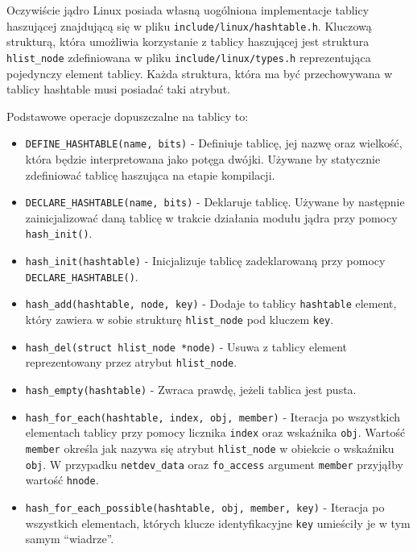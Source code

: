 \documentclass[11pt]{scrartcl}
\begin{document}
Oczywiście jądro Linux posiada własną uogólniona implementacje tablicy haszującej znajdującą się w pliku \texttt{include/linux/hashtable.h}.  Kluczową strukturą, która umożliwia korzystanie z tablicy haszującej jest struktura \texttt{hlist\_node} zdefiniowana w pliku \texttt{include/linux/types.h} reprezentująca pojedynczy element tablicy. Każda struktura, która ma być przechowywana w tablicy hashtable musi posiadać taki atrybut.

Podstawowe operacje dopuszczalne na tablicy to:

\begin{itemize}
\itemsep1pt\parskip0pt
\item
  \texttt{DEFINE\_HASHTABLE(name, bits)} - Definiuje tablicę, jej nazwę oraz wielkość, która będzie interpretowana jako potęga dwójki. Używane by statycznie zdefiniować tablicę haszująca na etapie kompilacji.
\item
  \texttt{DECLARE\_HASHTABLE(name, bits)} - Deklaruje tablicę. Używane by następnie zainicjalizować daną tablicę w trakcie działania modułu jądra przy pomocy \texttt{hash\_init()}.
\item
  \texttt{hash\_init(hashtable)} - Inicjalizuje tablicę zadeklarowaną przy pomocy \newline\texttt{DECLARE\_HASHTABLE()}.
\item
  \texttt{hash\_add(hashtable, node, key)} - Dodaje to tablicy \texttt{hashtable} element, który zawiera w sobie strukturę \texttt{hlist\_node} pod kluczem \texttt{key}.
\item
  \texttt{hash\_del(struct hlist\_node *node)} - Usuwa z tablicy element reprezentowany przez atrybut \texttt{hlist\_node}.
\item
  \texttt{hash\_empty(hashtable)} - Zwraca prawdę, jeżeli tablica jest pusta.
\item
  \texttt{hash\_for\_each(hashtable, index, obj, member)} - Iteracja po wszystkich elementach tablicy przy pomocy licznika \texttt{index} oraz wskaźnika \texttt{obj}. Wartość \texttt{member} określa jak nazywa się atrybut \texttt{hlist\_node} w obiekcie o wskaźniku \texttt{obj}. W przypadku \texttt{netdev\_data} oraz \texttt{fo\_access} argument \texttt{member} przyjąłby wartość \texttt{hnode}.
\item
  \texttt{hash\_for\_each\_possible(hashtable, obj, member, key)} - Iteracja po wszystkich elementach, których klucze identyfikacyjne \texttt{key} umieściły je w tym samym ``wiadrze''.
\end{itemize}
\end{document}
